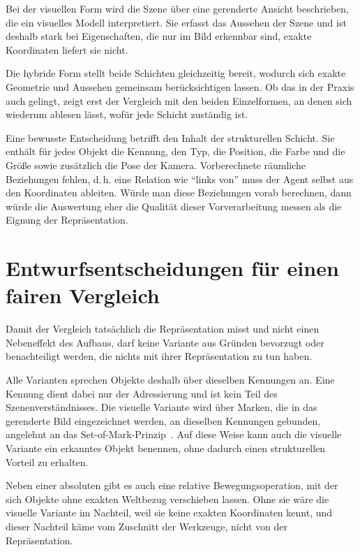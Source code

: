 Bei der visuellen Form wird die Szene über eine gerenderte Ansicht beschrieben, die ein visuelles Modell interpretiert.
Sie erfasst das Aussehen der Szene und ist deshalb stark bei Eigenschaften, die nur im Bild erkennbar sind, exakte Koordinaten liefert sie nicht.

Die hybride Form stellt beide Schichten gleichzeitig bereit, wodurch sich exakte Geometrie und Aussehen gemeinsam berücksichtigen lassen.
Ob das in der Praxis auch gelingt, zeigt erst der Vergleich mit den beiden Einzelformen, an denen sich wiederum ablesen lässt, wofür jede Schicht zuständig ist.

Eine bewusste Entscheidung betrifft den Inhalt der strukturellen Schicht.
Sie enthält für jedes Objekt die Kennung, den Typ, die Position, die Farbe und die Größe sowie zusätzlich die Pose der Kamera.
Vorberechnete räumliche Beziehungen fehlen, d.\,h. eine Relation wie \enquote{links von} muss der Agent selbst aus den Koordinaten ableiten.
Würde man diese Beziehungen vorab berechnen, dann würde die Auswertung eher die Qualität dieser Vorverarbeitung messen als die Eignung der Repräsentation.


\section[Entwurfsentscheidungen]{Entwurfsentscheidungen für einen fairen Vergleich}
\label{sec:konz-fairness}

Damit der Vergleich tatsächlich die Repräsentation misst und nicht einen Nebeneffekt des Aufbaus, darf keine Variante aus Gründen bevorzugt oder benachteiligt werden, die nichts mit ihrer Repräsentation zu tun haben.

Alle Varianten sprechen Objekte deshalb über dieselben Kennungen an.
Eine Kennung dient dabei nur der Adressierung und ist kein Teil des Szenenverständnisses.
Die visuelle Variante wird über Marken, die in das gerenderte Bild eingezeichnet werden, an dieselben Kennungen gebunden, angelehnt an das Set-of-Mark-Prinzip~\cite{yang2023}.
Auf diese Weise kann auch die visuelle Variante ein erkanntes Objekt benennen, ohne dadurch einen strukturellen Vorteil zu erhalten.

Neben einer absoluten gibt es auch eine relative Bewegungsoperation, mit der sich Objekte ohne exakten Weltbezug verschieben lassen.
Ohne sie wäre die visuelle Variante im Nachteil, weil sie keine exakten Koordinaten kennt, und dieser Nachteil käme vom Zuschnitt der Werkzeuge, nicht von der Repräsentation.

